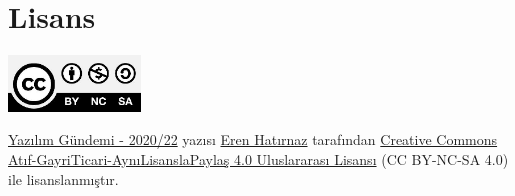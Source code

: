 \documentclass[11pt]{article}
\begin{document}
\section{Lisans}
\label{sec:org5f7347f}
\begin{center}
\begin{center}
\includegraphics[height=1.5cm]{../../../img/CC_BY-NC-SA_4.0.png}
\end{center}

\href{yazilim-gundemi-2020-22.pdf}{Yazılım Gündemi - 2020/22} yazısı \href{https://erenhatirnaz.github.io}{Eren Hatırnaz} tarafından \href{http://creativecommons.org/licenses/by-nc-sa/4.0/}{Creative Commons
Atıf-GayriTicari-AynıLisanslaPaylaş 4.0 Uluslararası Lisansı} (CC BY-NC-SA 4.0)
ile lisanslanmıştır.
\end{center}
\end{document}

